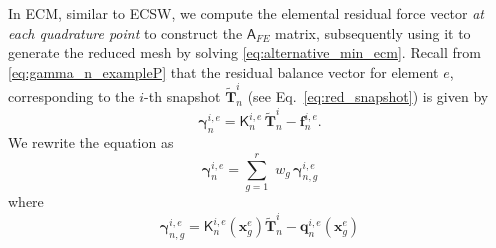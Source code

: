 \documentclass[11pt]{article}
\renewcommand{\vec}[1]{\mathbf{#1}}
\newcommand{\mat}[1]{\mathsf{#1}}
\begin{document}
In ECM, similar to ECSW, we compute the elemental residual force vector \textit{at each quadrature point} to construct the $\mat{A}_{FE}$ matrix, subsequently using it to generate the reduced mesh by solving \cref{eq:alternative_min_ecm}.
Recall from \cref{eq:gamma_n_exampleP} that the residual balance vector for element $e$, corresponding to the $i$-th snapshot $\widetilde{\vec{T}}^i_n$ (see Eq.~\ref{eq:red_snapshot}) is given by
\begin{equation}
    \boldsymbol{\gamma}^{i,e}_{n} = \mat{K}^{i,e}_n \,\widetilde{\vec{T}}^i_n - \vec{f}^{i,e}_n.
\end{equation}
We rewrite the equation as
\begin{equation}
    \boldsymbol{\gamma}^{i,e}_{n} = \sum_{g=1}^{r}\,\,w_g\,\boldsymbol{\gamma}^{i,e}_{n,g}
\end{equation}
where
\begin{equation}
    \boldsymbol{\gamma}^{i,e}_{n,g} = \mat{K}_n^{i,e}(\vec{x}^e_g)\widetilde{\vec{T}}^i_n - \vec{q}_n^{i,e}(\vec{x}^e_g)
\end{equation}
\end{document}
